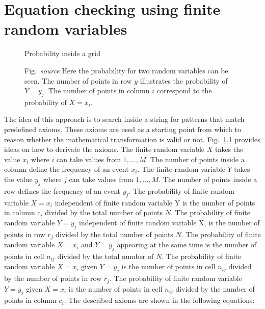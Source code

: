 

    \chapter{Equation checking using finite random variables}
    \label{bayestheoremfiniterandomvariables}
    \begin{figure}[H]
        
        \caption{Probability inside a grid}
        \caption*{Fig.~\textit{source} \cite[p.13]{bishop2006pattern} Here the probability for two random variables can be seen. The number of points in row
        $y$ illustrates the probability of $Y=y_{j}$. The number of points in column $i$ correspond to the probability of $X=x_{i}$.} \label{fig:Probability for two random variables}
    \end{figure}
    The idea of this approach is to search inside a string for patterns that match predefined axioms. These axioms are used as a starting point from which
    to reason whether the mathematical transformation is valid or not. Fig.~\ref{fig:Probability for two random variables} provides ideas on how to derivate the axioms.
    The finite random variable $X$ takes the value $x_{i}$ where $i$ can take values from $1,...,M$.
    The number of points inside a column define the frequency of an event $x_{i}$.
    The finite random variable $Y$ takes the value $y_{j}$ where $j$ can take values from $1,...,M$. The number of points inside a row defines the frequency of an event $y_{j}$.
    The probability of finite random variable $X = x_{i}$ independent of finite random variable Y is the number of points in column $c_{i}$ divided by the total number of points $N$.
    The probability of finite random variable $Y = y_{j}$ independent of finite random variable X, is the number of points in row $r_{j}$ divided by the total number of points $N$.
    The probability of finite random variable $X = x_{i}$ and $Y = y_{j}$ appearing at the same time is the number of points in cell $n_{ij}$ divided by the total number of $N$.
    The probability of finite random variable $X = x_{i}$ given $Y = y_{j}$ is the number of points in cell $n_{ij}$ divided by the number of points in row $r_{j}$. The probability
    of finite random variable $Y = y_{j}$ given $X = x_{i}$ is the number of points in cell $n_{ij}$ divided by the number of points in column $c_{i}$.
    The described axioms \cite[p.13 - 15]{bishop2006pattern} are shown in the following equations:
